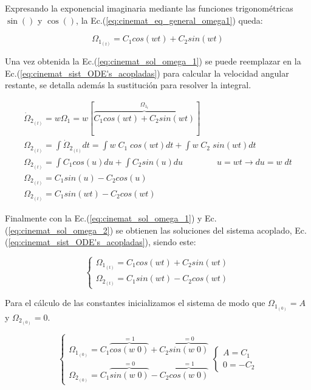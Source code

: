 \documentclass[oneside,a4paper,english,links]{amca}
\begin{document}
Expresando la exponencial imaginaria mediante las funciones trigonom\'etricas $\sin()$ y $\cos()$, la Ec.(\ref{eq:cinemat_eq_general_omega1}) queda:

\begin{equation}
  \Omega_{1_{(t)}} = C_1 cos(wt) + C_2 sin(wt)
  \label{eq:cinemat_sol_omega_1}
\end{equation}

Una vez obtenida la Ec.(\ref{eq:cinemat_sol_omega_1}) se puede reemplazar en la Ec.(\ref{eq:cinemat_sist_ODE's_acopladas}) para calcular la velocidad angular restante, se detalla adem\'as la sustituci\'on para resolver la integral.

\begin{equation}
\begin{split}
    \dot{\Omega}_{2_{(t)}}=w \Omega_1 = w \left[\overbrace{C_1 cos(wt) + C_2 sin(wt)}^{\Omega_{1_{t}}}\right]\\
    \Omega_{2_{(t)}}=\int \dot{\Omega}_{2_{(t)}} dt = \int w\; C_1\; cos(wt) dt +\int w\;C_2\; sin(wt) dt\\
    \Omega_{2_{(t)}}=\int C_1 cos(u) du + \int C_2 sin(u) du \qquad\qquad u=wt\xrightarrow{}du=w\;dt\\
    \Omega_{2_{(t)}}=C_1 sin(u) - C_2 cos(u)\\
    \Omega_{2_{(t)}}=C_1 sin(wt) - C_2 cos(wt)
\end{split}
\label{eq:cinemat_sol_omega_2}
\end{equation}

Finalmente con la Ec.(\ref{eq:cinemat_sol_omega_1}) y Ec.(\ref{eq:cinemat_sol_omega_2}) se obtienen las soluciones del sistema acoplado, Ec.(\ref{eq:cinemat_sist_ODE's_acopladas}), siendo este:

\begin{equation}
    \begin{cases}
     \Omega_{1_{(t)}} = C_1 cos(wt) + C_2 sin(wt)\\
    \Omega_{2_{(t)}}=C_1 sin(wt) - C_2cos(wt)
    \end{cases}
    \label{eq:cinemat_sol_precesion_nico}
\end{equation}

Para el c\'alculo de las constantes inicializamos el sistema de modo que $\Omega_{1_{(0)}}=A$ y $\Omega_{2_{(0)}}=0$.

\begin{equation}
    \begin{cases}
    \Omega_{1_{(0)}} = C_1 \overbrace{cos(w\;0)}^{=1} + C_2 \overbrace{sin(w\;0)}^{=0}\\
    \Omega_{2_{(0)}}=C_1 \overbrace{sin(w\;0)}^{=0} - C_2\overbrace{cos(w\;0)}^{=1}   
    \end{cases}
    \begin{cases}
    A = C_1 \\
    0= - C_2   
    \end{cases}
    \label{eq:cinemat_inicializacion_ODEs_precesion}
\end{equation}
\end{document}
